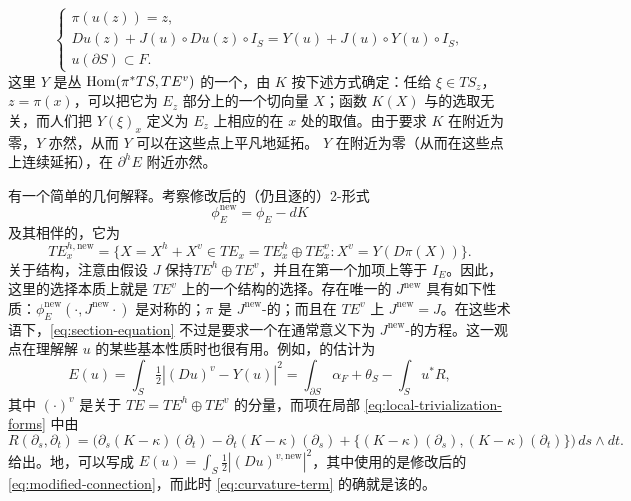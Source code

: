 \begin{equation}\label{eq:section-equation}
\begin{cases}
\pi(u(z))=z,\\
Du(z)+J(u)\circ Du(z)\circ I_S=Y(u)+J(u)\circ Y(u)\circ I_S,\\
u(\partial S)\subset F.
\end{cases}
\end{equation}
这里 $Y$ 是丛 $\operatorname{Hom}(\pi^*TS,TE^v)$ 的一个\trSection，由 $K$ 按下述方式确定：任给 $\xi\in TS_z$，$z=\pi(x)$，可以把它\trLift{}为 $E_z$ \trRegular{}部分上的一个切向量 $X$；函数 $K(X)$ 与\trLift{}的选取无关，而人们把 $Y(\xi)_x$ 定义为 $E_z$ 上相应的\trHamiltonianVectorField{}在 $x$ 处的取值。由于要求 $K$ 在\trCriticalPoint{}附近为零，$Y$ 亦然，从而 $Y$ 可以在这些点上平凡地延拓。
$Y$ 在\trCriticalPoint{}附近为零（从而在这些点上连续延拓），在 $\partial^hE$ 附近亦然。
\begin{remark}\label{thm:relative-perturbation-geometry}
\trRelative\trPerturbationDatum{}有一个简单的几何解释。考察修改后的（仍\trClosed{}且逐\trFiber{}\trSymplectic{}的）2-形式
\begin{equation}\label{eq:modified-form}
\phi_E^{\mathrm{new}}=\phi_E-dK
\end{equation}
及其相伴的\trConnection，它为
\begin{equation}\label{eq:modified-connection}
TE_x^{h,\mathrm{new}}=\{X=X^h+X^v\in TE_x=TE_x^h\oplus TE_x^v : X^v=Y(D\pi(X))\}.
\end{equation}
关于\trAlmostComplex{}结构，注意由假设 $J$ 保持\trSplitting{}$TE^h\oplus TE^v$，并且在第一个加项上等于 $I_E$。因此，这里的选择本质上就是 $TE^v$ 上的一个\trAlmostComplex{}结构{}的选择。存在唯一的 $J^{\mathrm{new}}$ 具有如下性质：$\phi_E^{\mathrm{new}}(\cdot,J^{\mathrm{new}}\cdot)$ 是对称的；$\pi$ 是 $J^{\mathrm{new}}$-\trHolomorphic{}的；而且在 $TE^v$ 上 $J^{\mathrm{new}}=J$。在这些术语下，\eqref{eq:section-equation} 不过是要求一个\trSection{}在通常意义下为 $J^{\mathrm{new}}$-\trHolomorphic{}的方程。\trConnection{}这一观点在理解解 $u$ 的某些基本性质时也很有用。例如，\trEnergy{}的\trApriori{}估计为
\begin{equation*}
E(u)=\int_S\tfrac12|(Du)^v-Y(u)|^2=\int_{\partial S}\alpha_F+\theta_S-\int_S u^*R,
\end{equation*}
其中 $(\cdot)^v$ 是关于 $TE=TE^h\oplus TE^v$ 的\trVertical{}分量，而\trCurvature{}项在局部\trTrivialization{} \eqref{eq:local-trivialization-forms} 中由
\begin{equation}\label{eq:curvature-term}
R(\partial_s,\partial_t)=\bigl(\partial_s(K-\kappa)(\partial_t)-\partial_t(K-\kappa)(\partial_s)+\{(K-\kappa)(\partial_s),(K-\kappa)(\partial_t)\}\bigr)\,ds\wedge dt.
\end{equation}
给出。\trEquivalence{}地，可以写成 $E(u)=\int_S\tfrac12|(Du)^{v,\mathrm{new}}|^2$，其中使用的是修改后的\trConnection{} \eqref{eq:modified-connection}，而此时 \eqref{eq:curvature-term} 的确就是该\trConnection{}的\trCurvature。
\end{remark}
